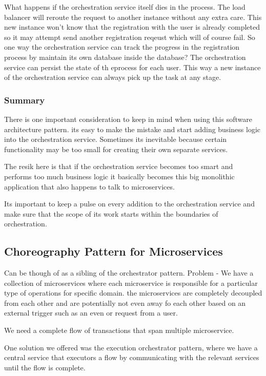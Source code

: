 What happens if the orchestration service itself dies in the process.
The load balancer will reroute the request to another instance without any extra care.
This new instance won't know that the registration with the user is already completed so it may attempt send another registration reqeust which will of course fail.
So one way the orchestration service can track the progress in the registration process by maintain its own database inside the database?
The orchestration service can persist the state of th eprocess for each user.
This way a new instance of the orchestration service can always pick up the task at any stage.

\subsubsection{Summary}
There is one important consideration to keep in mind when using this software architecture pattern.
its easy to make the mistake and start adding business logic into the orchestration service.
Sometimes its inevitable because certain functionality may be too small for creating their own separate services.

The resik here is that if the orchestration service becomes too smart and performs too much business logic it basically becomes this big monolithic application that also happens to talk to microservices.

Its important to keep a pulse on every addition to the orchestration service and make sure that the scope of its work starts within the boundaries of orchestration.

\subsection{Choreography Pattern for Microservices}
Can be though of as a sibling of the orchestrator pattern.
Problem - We have a collection of microservices where each microservice is responsible for a particular type of operations for specific domain.
the microservices are completely decoupled from each other and are potentially not even away fo each other based on an external trigger such as an even or request from a user.

We need a complete flow of transactions that span multiple microservice.

One solution we offered was the execution orchestrator pattern, where we have a central service that executors a flow by communicating with the relevant services until the flow is complete.


